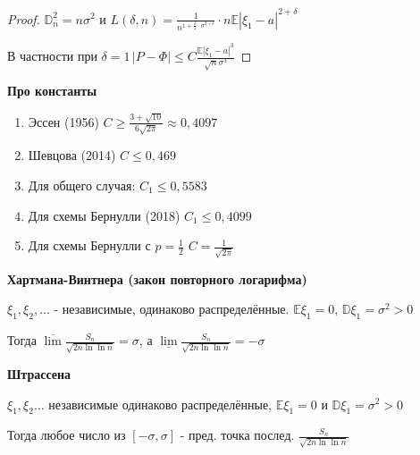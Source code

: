 \begin{proof}
    $\mathbb{D}_n^2 = n \sigma^2$ и $L (\delta, n) = \frac{1}{n^{1 + \frac{\delta}{2} \cdot \sigma^{2 + \delta}}} \cdot n \mathbb{E} |\xi_1 - a|^{2 + \delta}$

    В частности при $\delta = 1 \, |P - \Phi| \leqslant C \frac{\mathbb{E} |\xi_1 - a|^3}{\sqrt{n} \sigma^3}$
\end{proof}

\begin{remark}
    \textbf{Про константы}

    \begin{enumerate}
        \item {
            Эссен (1956) $C \geqslant \frac{3 + \sqrt{10}}{6 \sqrt{2 \pi}} \approx 0,4097$
        }
        \item {
            Шевцова (2014) $C \leqslant 0,469$
        }
        \item {
            Для общего случая: $C_1 \leqslant 0,5583$
        }
        \item {
            Для схемы Бернулли (2018) $C_1 \leqslant 0,4099$
        }
        \item {
            Для схемы Бернулли с $p = \frac{1}{2}$ $C = \frac{1}{\sqrt{2\pi}}$
        }
    \end{enumerate}
\end{remark}

\begin{theorem}
    \textbf{Хартмана-Винтнера (закон повторного логарифма)}

    $\xi_1, \xi_2, \ldots$ - независимые, одинаково распределённые. $\mathbb{E} \xi_1 = 0, \, \mathbb{D} \xi_1 = \sigma^2 > 0$

    Тогда $\overline{\lim} \frac{S_n}{\sqrt{2n \ln \ln n}} = \sigma$, а $\underline{\lim} \frac{S_n}{\sqrt{2n \ln \ln n}} = -\sigma$
\end{theorem}

\begin{theorem}
    \textbf{Штрассена} 

    $\xi_1, \xi_2 \ldots$ независимые одинаково распределённые, $\mathbb{E} \xi_1 = 0$ и $\mathbb{D} \xi_1 = \sigma^2 > 0$

    Тогда любое число из $[-\sigma, \sigma]$ - пред. точка послед. $\frac{S_n}{\sqrt{2n \ln \ln n}}$
\end{theorem}
